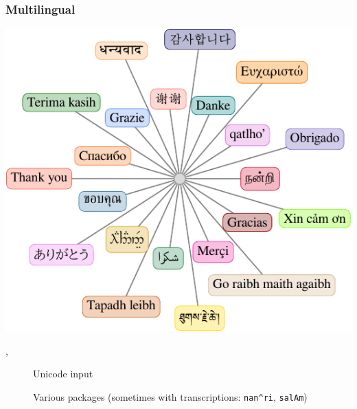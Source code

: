 \begin{frame}
\frametitle{Multilingual }
\centering\includegraphics[height=.7\textheight]{multiling-TQ}\par
\pause
\begin{description}
\item[, ] Unicode input
\item[] Various packages {\small (sometimes with transcriptions:  \texttt{nan\textasciicircum ri}, \texttt{salAm})}
\end{description}
\end{frame}

